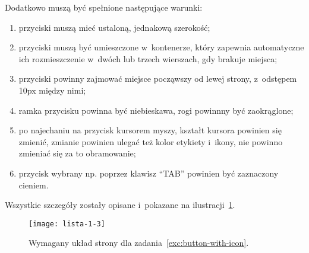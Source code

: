 \documentclass[12pt]{article}
\begin{document}
\begin{enumerate}
            Dodatkowo muszą być spełnione następujące warunki:
            \begin{enumerate}
                \item przyciski muszą mieć ustaloną, jednakową szerokość;
                \item przyciski muszą być umieszczone w~kontenerze, który zapewnia automatyczne ich rozmieszczenie w~dwóch lub trzech wierszach, gdy brakuje miejsca;
                \item przyciski powinny zajmować miejsce począwszy od lewej strony, z~odstępem 10px między nimi;
                \item ramka przycisku powinna być niebieskawa, rogi powinnny być zaokrąglone;
                \item po najechaniu na przycisk kursorem myszy, kształt kursora powinien się zmienić, zmianie powinien ulegać też kolor etykiety i~ikony, nie powinno zmieniać się za to obramowanie;
                \item przycisk wybrany np. poprzez klawisz ``TAB'' powinien być zaznaczony cieniem.
            \end{enumerate}

            Wszystkie szczegóły zostały opisane i~pokazane na ilustracji~\ref{fig:button-with-icon}.

            \begin{figure}[p]
                \centering
                \texttt{[image: lista-1-3]}
                \caption{Wymagany układ strony dla zadania~\ref{exc:button-with-icon}.}
                \label{fig:button-with-icon}
            \end{figure}
    \end{enumerate}
\end{document}
